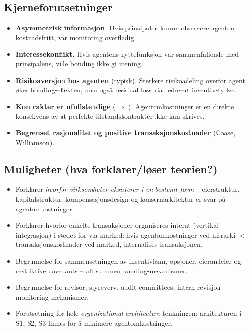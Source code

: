 \subsection*{Kjerneforutsetninger}
\begin{itemize}
\item \textbf{Asymmetrisk informasjon.} Hvis prinsipalen kunne observere agenten kostnadsfritt, var monitoring overflødig.
\item \textbf{Interessekonflikt.} Hvis agentens nyttefunksjon var sammenfallende med prinsipalens, ville bonding ikke gi mening.
\item \textbf{Risikoaversjon hos agenten} (typisk). Sterkere risikoadeling overfor agent øker bonding-effekten, men også residual loss via redusert insentivstyrke.
\item \textbf{Kontrakter er ufullstendige} ($\Rightarrow$ ). Agentomkostninger er en direkte konsekvens av at perfekte tilstandskontrakter ikke kan skrives.
\item \textbf{Begrenset rasjonalitet og positive transaksjonskostnader} (Coase, Williamson).
\end{itemize}

\subsection*{Muligheter (hva forklarer/løser teorien?)}
\begin{itemize}
\item Forklarer \emph{hvorfor virksomheter eksisterer i en bestemt form} -- eierstruktur, kapitalstruktur, kompensasjonsdesign og konsernarkitektur er svar på agentomkostninger.
\item Forklarer hvorfor enkelte transaksjoner organiseres internt (vertikal integrasjon) i stedet for via marked: hvis agentomkostninger ved hierarki $<$ transaksjonskostnader ved marked, internalises transaksjonen.
\item Begrunnelse for sammensetningen av insentivlønn, opsjoner, eierandeler og restriktive covenants -- alt sammen bonding-mekanismer.
\item Begrunnelse for revisor, styreverv, audit committees, intern revisjon -- monitoring-mekanismer.
\item Forutsetning for hele \emph{organizational architecture}-tenkningen: arkitekturen i S1, S2, S3 finnes for å minimere agentomkostninger.
\end{itemize}

